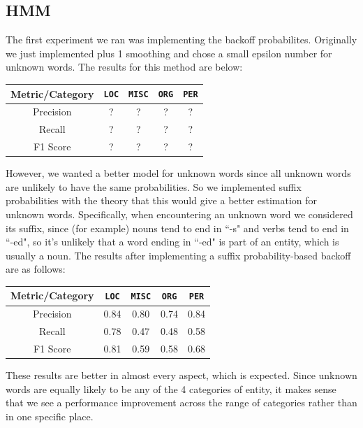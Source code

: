\documentclass[12pt]{article}
\begin{document}
\subsection{HMM}
The first experiment we ran was implementing the backoff probabilites. Originally we just implemented plus 1 smoothing and chose a small epsilon number for unknown words. The results for this method are below:
\begin{center}
	\begin{tabular}{|c|c|c|c|c|}
		\hline
		\textbf{Metric/Category} & {\tt LOC} & {\tt MISC} & {\tt ORG} & {\tt PER}\\
		\hline
		Precision & ? & ? & ? & ?\\
		\hline
		Recall & ? & ? & ? & ?\\
		\hline
		F1 Score & ? & ? & ? & ?\\
		\hline
	\end{tabular}
\end{center}
However, we wanted a better model for unknown words since all unknown words are unlikely to have the same probabilities. So we implemented suffix probabilities with the theory that this would give a better estimation for unknown words. Specifically, when encountering an unknown word we considered its suffix, since (for example) nouns tend to end in ``-s" and verbs tend to end in ``-ed", so it's unlikely that a word ending in ``-ed" is part of an entity, which is usually a noun. The results after implementing a suffix probability-based backoff are as follows:
\begin{center}
	\begin{tabular}{|c|c|c|c|c|}
		\hline
		\textbf{Metric/Category} & {\tt LOC} & {\tt MISC} & {\tt ORG} & {\tt PER}\\
		\hline
		Precision & 0.84 & 0.80 & 0.74 & 0.84\\
		\hline
		Recall & 0.78 & 0.47 & 0.48 & 0.58\\
		\hline
		F1 Score & 0.81 & 0.59 & 0.58 & 0.68\\
		\hline
	\end{tabular}
\end{center}
These results are better in almost every aspect, which is expected. Since unknown words are equally likely to be any of the 4 categories of entity, it makes sense that we see a performance improvement across the range of categories rather than in one specific place.  
\end{document}
